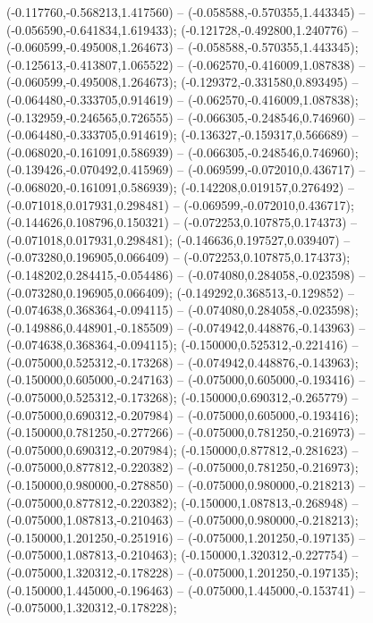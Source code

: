  (-0.117760,-0.568213,1.417560) -- (-0.058588,-0.570355,1.443345) -- (-0.056590,-0.641834,1.619433);
 (-0.121728,-0.492800,1.240776) -- (-0.060599,-0.495008,1.264673) -- (-0.058588,-0.570355,1.443345);
 (-0.125613,-0.413807,1.065522) -- (-0.062570,-0.416009,1.087838) -- (-0.060599,-0.495008,1.264673);
 (-0.129372,-0.331580,0.893495) -- (-0.064480,-0.333705,0.914619) -- (-0.062570,-0.416009,1.087838);
 (-0.132959,-0.246565,0.726555) -- (-0.066305,-0.248546,0.746960) -- (-0.064480,-0.333705,0.914619);
 (-0.136327,-0.159317,0.566689) -- (-0.068020,-0.161091,0.586939) -- (-0.066305,-0.248546,0.746960);
 (-0.139426,-0.070492,0.415969) -- (-0.069599,-0.072010,0.436717) -- (-0.068020,-0.161091,0.586939);
 (-0.142208,0.019157,0.276492) -- (-0.071018,0.017931,0.298481) -- (-0.069599,-0.072010,0.436717);
 (-0.144626,0.108796,0.150321) -- (-0.072253,0.107875,0.174373) -- (-0.071018,0.017931,0.298481);
 (-0.146636,0.197527,0.039407) -- (-0.073280,0.196905,0.066409) -- (-0.072253,0.107875,0.174373);
 (-0.148202,0.284415,-0.054486) -- (-0.074080,0.284058,-0.023598) -- (-0.073280,0.196905,0.066409);
 (-0.149292,0.368513,-0.129852) -- (-0.074638,0.368364,-0.094115) -- (-0.074080,0.284058,-0.023598);
 (-0.149886,0.448901,-0.185509) -- (-0.074942,0.448876,-0.143963) -- (-0.074638,0.368364,-0.094115);
 (-0.150000,0.525312,-0.221416) -- (-0.075000,0.525312,-0.173268) -- (-0.074942,0.448876,-0.143963);
 (-0.150000,0.605000,-0.247163) -- (-0.075000,0.605000,-0.193416) -- (-0.075000,0.525312,-0.173268);
 (-0.150000,0.690312,-0.265779) -- (-0.075000,0.690312,-0.207984) -- (-0.075000,0.605000,-0.193416);
 (-0.150000,0.781250,-0.277266) -- (-0.075000,0.781250,-0.216973) -- (-0.075000,0.690312,-0.207984);
 (-0.150000,0.877812,-0.281623) -- (-0.075000,0.877812,-0.220382) -- (-0.075000,0.781250,-0.216973);
 (-0.150000,0.980000,-0.278850) -- (-0.075000,0.980000,-0.218213) -- (-0.075000,0.877812,-0.220382);
 (-0.150000,1.087813,-0.268948) -- (-0.075000,1.087813,-0.210463) -- (-0.075000,0.980000,-0.218213);
 (-0.150000,1.201250,-0.251916) -- (-0.075000,1.201250,-0.197135) -- (-0.075000,1.087813,-0.210463);
 (-0.150000,1.320312,-0.227754) -- (-0.075000,1.320312,-0.178228) -- (-0.075000,1.201250,-0.197135);
 (-0.150000,1.445000,-0.196463) -- (-0.075000,1.445000,-0.153741) -- (-0.075000,1.320312,-0.178228);
